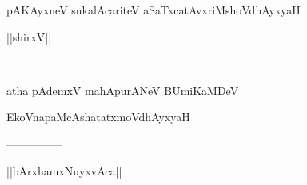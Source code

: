 \documentclass{article}
\begin{document}
\begin{center}
pAKAyxneV sukalAcariteV aSaTxcatAvxriMshoVdhAyxyaH
\end{center}

\begin{center}
||shirxV||
\end{center}

\begin{center}
--------
\end{center}

\begin{center}
atha pAdemxV mahApurANeV BUmiKaMDeV
\end{center}

\begin{center}
EkoVnapaMcAshatatxmoVdhAyxyaH
\end{center}

\begin{center}
---------------
\end{center}

\begin{center}
||bArxhamxNuyxvAca||
\end{center}
\end{document}

